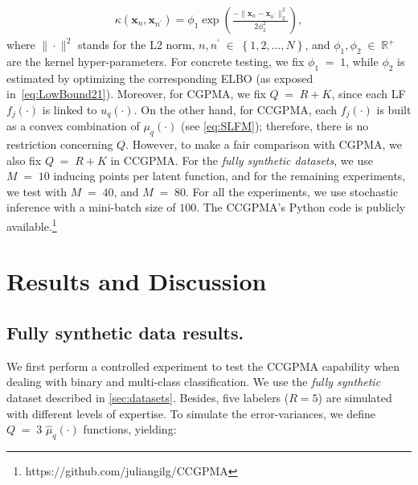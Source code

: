 \documentclass[journal]{IEEEtran}
\providecommand{\ve}[1]{{\bm{#1}}}%
\newcommand{\Real}{\mathbb{R}}
\DeclareMathOperator{\en}{\!\,\in\!\,}
\DeclareMathOperator{\igual}{\!\,=\!\,}
\providecommand{\ve}[1]{{\mathbf{#1}}}
\begin{document}
\begin{align}\label{eq:RBF}
\kappa(\ve{x}_n, \ve{x}_{n^{\prime}}) = \phi_1\exp\left(\frac{-\|\ve{x}_n- \ve{x}_{n^{\prime}} \|_2^2}{2{\phi}_2^2}\right),
\end{align}
where $\|\cdot\|^2$ stands for the L$2$ norm, $n,n^{\prime} \en \left\{1,2,\dots, N\right\}$, and $\phi_1,\phi_2\en \Real^+$ are the kernel hyper-parameters. For concrete testing, we fix $\phi_1\igual1$, while ${\phi}_2$ is estimated by optimizing the corresponding ELBO (as exposed in~\cref{eq:LowBound21}). Moreover, for CGPMA, we fix $Q\igual R+K$, since each LF $f_j(\cdot)$ is linked to $u_q(\cdot)$. On the other hand, for CCGPMA, each $f_j(\cdot)$ is built as a convex combination of $\mu_q(\cdot)$ (see \cref{eq:SLFM}); therefore, there is no restriction concerning $Q$. However, to make a fair comparison with CGPMA, we also fix $Q\igual R+K$ in CCGPMA. For the \textit{fully synthetic datasets}, we use $M\igual 10$ inducing points per latent function, and for the remaining experiments, we test with $M\igual 40$, and $M\igual 80$.  For all the experiments, we use stochastic inference with a mini-batch size of $100$. The CCGPMA's Python code is publicly available.\footnote{https://github.com/juliangilg/CCGPMA}

\section{Results and Discussion}

\subsection{Fully synthetic data results.} 

We first perform a controlled experiment to test the CCGPMA capability when dealing with binary and multi-class classification. We use the \textit{fully synthetic} dataset described in \cref{sec:datasets}. Besides, five labelers ($R=5$) are simulated with different levels of expertise. To simulate the error-variances, we define $Q\igual3$ $\hat{\mu}_q(\cdot)$ functions, yielding: 
\end{document}
